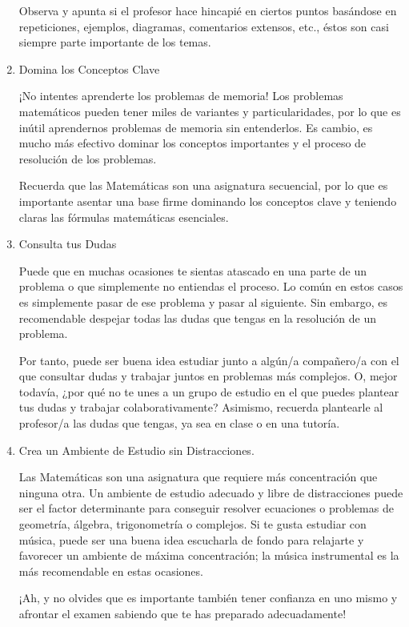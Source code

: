 \begin{enumerate}
Observa y apunta si el profesor hace hincapié en ciertos puntos basándose en repeticiones, ejemplos, diagramas, comentarios extensos, etc., éstos son casi siempre parte importante de los temas.

\item Domina los Conceptos Clave

¡No intentes aprenderte los problemas de memoria! Los problemas matemáticos pueden tener miles de variantes y particularidades, por lo que es inútil aprendernos problemas de memoria sin entenderlos. Es cambio, es mucho más efectivo dominar los conceptos importantes y el proceso de resolución de los problemas.

Recuerda que las Matemáticas son una asignatura secuencial, por lo que es importante asentar una base firme dominando los conceptos clave y teniendo claras las fórmulas matemáticas esenciales.

\item Consulta tus Dudas

Puede que en muchas ocasiones te sientas atascado en una parte de un problema o que simplemente no entiendas el proceso. Lo común en estos casos es simplemente pasar de ese problema y pasar al siguiente. Sin embargo, es recomendable despejar todas las dudas que tengas en la resolución de un problema.

Por tanto, puede ser buena idea estudiar junto a algún/a compañero/a con el que consultar dudas y trabajar juntos en problemas más complejos. O, mejor todavía, ¿por qué no te unes a un grupo de estudio en el que puedes plantear tus dudas y trabajar colaborativamente? Asimismo, recuerda plantearle al profesor/a las dudas que tengas, ya sea en clase o en una tutoría.

\item Crea un Ambiente de Estudio sin Distracciones.

Las Matemáticas son una asignatura que requiere más concentración que ninguna otra. Un ambiente de estudio adecuado y libre de distracciones puede ser el factor determinante para conseguir resolver ecuaciones o problemas de geometría, álgebra, trigonometría o complejos. Si te gusta estudiar con música, puede ser una buena idea escucharla de fondo para relajarte y favorecer un ambiente de máxima concentración; la música instrumental es la más recomendable en estas ocasiones.

¡Ah, y no olvides que es importante también tener confianza en uno mismo y afrontar el examen sabiendo que te has preparado adecuadamente!

\end{enumerate}


